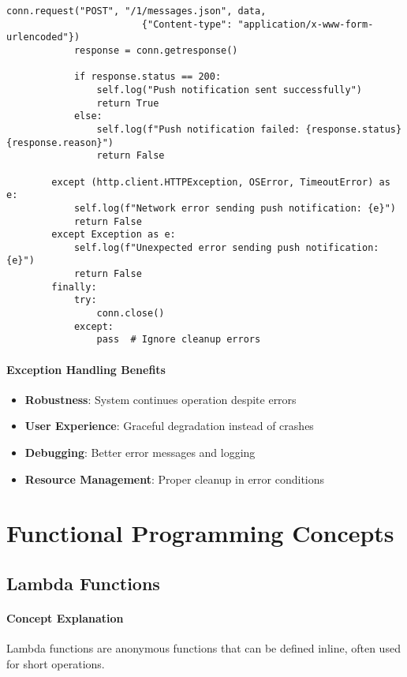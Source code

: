 \begin{lstlisting}[caption=Exception Handling in Agent System (Current and Potential)]
            conn.request("POST", "/1/messages.json", data,
                        {"Content-type": "application/x-www-form-urlencoded"})
            response = conn.getresponse()
            
            if response.status == 200:
                self.log("Push notification sent successfully")
                return True
            else:
                self.log(f"Push notification failed: {response.status} {response.reason}")
                return False
                
        except (http.client.HTTPException, OSError, TimeoutError) as e:
            self.log(f"Network error sending push notification: {e}")
            return False
        except Exception as e:
            self.log(f"Unexpected error sending push notification: {e}")
            return False
        finally:
            try:
                conn.close()
            except:
                pass  # Ignore cleanup errors
\end{lstlisting}

\paragraph{Exception Handling Benefits}
\begin{itemize}
\item \textbf{Robustness}: System continues operation despite errors
\item \textbf{User Experience}: Graceful degradation instead of crashes
\item \textbf{Debugging}: Better error messages and logging
\item \textbf{Resource Management}: Proper cleanup in error conditions
\end{itemize}

\section{Functional Programming Concepts}

\subsection{Lambda Functions}

\paragraph{Concept Explanation}
Lambda functions are anonymous functions that can be defined inline, often used for short operations.

